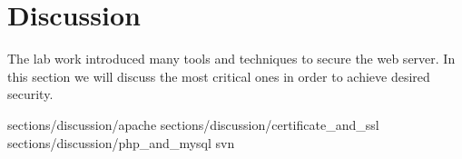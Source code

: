 \section {Discussion}

The lab work introduced many tools and techniques to secure the web server. In this section we will discuss the most critical ones in order to achieve desired security. 


 {sections/discussion/apache}
 {sections/discussion/certificate_and_ssl}
 {sections/discussion/php_and_mysql}
 {svn} %

